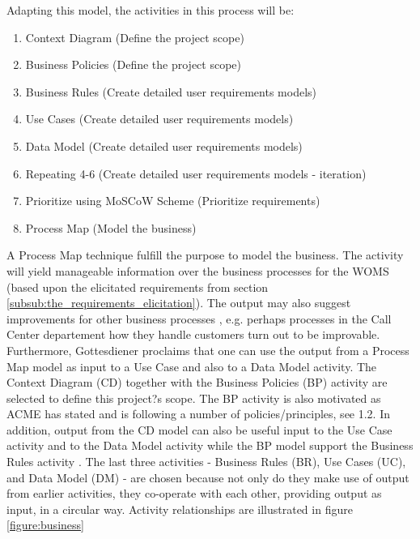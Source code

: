 \documentclass[a4paper]{article}
\begin{document}
Adapting this model, the activities in this process will be:
\begin{enumerate}
\item Context Diagram (Define the project scope)
\item Business Policies (Define the project scope)
\item Business Rules (Create detailed user requirements models)
\item Use Cases (Create detailed user requirements models)
\item Data Model (Create detailed user requirements models)
\item Repeating 4-6 (Create detailed user requirements models - iteration)
\item Prioritize using MoSCoW Scheme (Prioritize requirements)
\item Process Map (Model the business) 
\end{enumerate}



A Process Map technique fulfill the purpose to model the business. The activity will yield manageable information over the business processes for the WOMS (based upon the elicitated requirements from section \ref{subsub:the_requirements_elicitation}). The output may also suggest improvements for other business processes \cite{gott122}, e.g. perhaps processes in the Call Center departement how they handle customers turn out to be improvable. Furthermore, Gottesdiener proclaims that one can use the output from a Process Map model as input to a Use Case and also to a Data Model activity\cite{gott126}.
      The Context Diagram (CD) together with the Business Policies (BP) activity are selected to define this project?s scope. The BP activity is also motivated as ACME has stated and is following a number of policies/principles, see 1.2. In addition, output from the CD model can also be useful input to the Use Case activity and to the Data Model activity\cite{gott131} while the BP model support the Business Rules activity \cite{gott143}.
     The last three activities - Business Rules (BR), Use Cases (UC), and Data Model (DM) - are chosen because not only do they make use of output from earlier activities, they co-operate with each other, providing output as input, in a circular way. Activity relationships are illustrated in figure \ref{figure:business}
     
\end{document}
